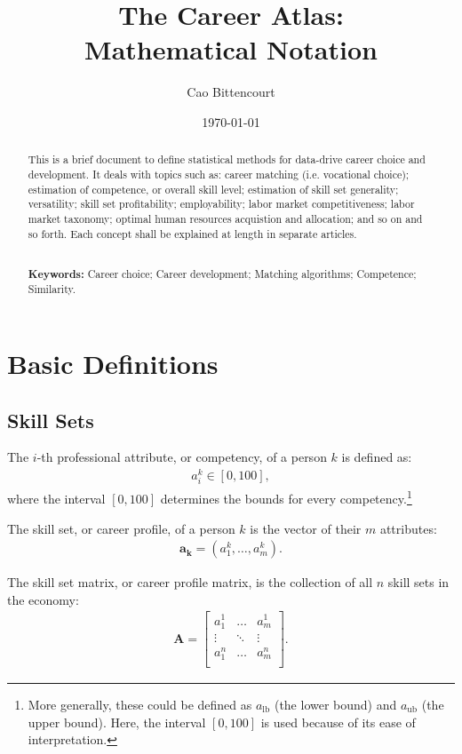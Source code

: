 \documentclass{elsarticle} %
\title{
    The Career Atlas:\\
    Mathematical Notation
}
\author{Cao Bittencourt}
\affiliation{{B. Sc. in Economics from EPGE (FGV), RJ, Brazil.}}
\affiliation{{Statistician at Atlas Career Guide Inc., FL, USA.}}
\date{\today}
\begin{document}

\begin{abstract}
    \noindent
    This is a brief document to define statistical methods for data-drive career choice and development. It deals with topics such as: career matching (i.e. vocational choice); estimation of competence, or overall skill level; estimation of skill set generality; versatility; skill set profitability; employability; labor market competitiveness; labor market taxonomy; optimal human resources acquistion and allocation; and so on and so forth. Each concept shall be explained at length in separate articles.

    \noindent
    \\ \textbf{Keywords:} Career choice; Career development; Matching algorithms; Competence; Similarity.
\end{abstract}

\maketitle

\section{Basic Definitions}
\subsection{Skill Sets}
The $i$-th professional attribute, or competency, of a person $k$ is defined
as:
\begin{gather}
    a_{i}^{k}
    \in [0, 100]
    ,
\end{gather}
where the interval $[0,100]$ determines the bounds for every competency.\footnote[1]{
    More generally, these could be defined as $a_\text{lb}$ (the lower bound) and $a_\text{ub}$ (the upper bound). Here, the interval $[0,100]$ is used because of its ease of interpretation.
}

The skill set, or career profile, of a person $k$ is the vector of their $m$
attributes:
\begin{gather}
    \boldsymbol{a_k} = (a_{1}^{k}, \dots, a_{m}^{k})
    .
\end{gather}

The skill set matrix, or career profile matrix, is the collection of all $n$
skill sets in the economy:
\begin{gather}
    \textbf{A} =
    \begin{bmatrix}
        a_{1}^{1} & \hdots & a_{m}^{1} \\
        \vdots    & \ddots & \vdots    \\
        a_{1}^{n} & \hdots & a_{m}^{n} \\
    \end{bmatrix}
    .
\end{gather}
\end{document}
